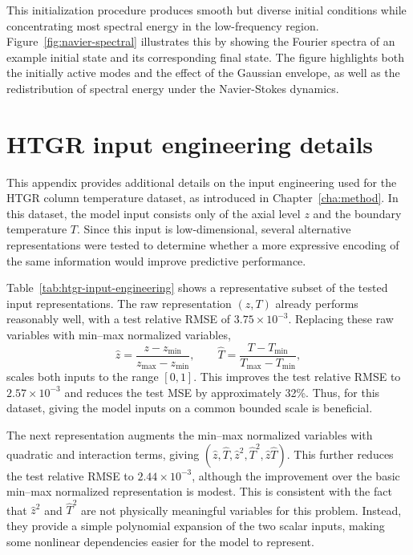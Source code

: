 This initialization procedure produces smooth but diverse initial
conditions while concentrating most spectral energy in the low-frequency
region. Figure~\ref{fig:navier-spectral} illustrates this by showing the
Fourier spectra of an example initial state and its corresponding final
state. The figure highlights both the initially active modes and the
effect of the Gaussian envelope, as well as the redistribution of
spectral energy under the Navier-Stokes dynamics.


\chapter{\label{appendix:htgr-input-engineering}HTGR input engineering details}

This appendix provides additional details on the input engineering used
for the HTGR column temperature dataset, as introduced in
Chapter~\ref{cha:method}. In this dataset, the model input consists only
of the axial level $z$ and the boundary temperature $T$. Since this input
is low-dimensional, several alternative representations were tested to
determine whether a more expressive encoding of the same information
would improve predictive performance.

Table~\ref{tab:htgr-input-engineering} shows a representative subset of
the tested input representations. The raw representation $(z,T)$ already
performs reasonably well, with a test relative RMSE of
$3.75 \times 10^{-3}$. Replacing these raw variables with min--max
normalized variables,
\[
    \hat z = \frac{z-z_{\min}}{z_{\max}-z_{\min}}, \qquad
    \hat T = \frac{T-T_{\min}}{T_{\max}-T_{\min}},
\]
scales both inputs to the range $[0,1]$. This improves the test relative
RMSE to $2.57 \times 10^{-3}$ and reduces the test MSE by approximately
32\%. Thus, for this dataset, giving the model inputs on a
common bounded scale is beneficial.

The next representation augments the min--max normalized variables with
quadratic and interaction terms, giving
$(\hat z,\hat T,\hat z^2,\hat T^2,\hat z\hat T)$. This further reduces
the test relative RMSE to $2.44 \times 10^{-3}$, although the improvement
over the basic min--max normalized representation is modest. This is
consistent with the fact that $\hat z^2$ and $\hat T^2$ are not physically meaningful variables for this problem. Instead, they provide a simple
polynomial expansion of the two scalar inputs, making some nonlinear
dependencies easier for the model to represent.

